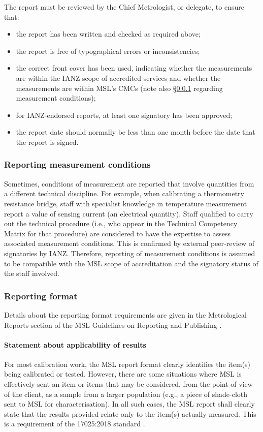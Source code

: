 The report must be reviewed by the Chief Metrologist, or delegate, to ensure that:
\begin{itemize}
\item the report has been written and checked as required above;
\item the report is free of typographical errors or inconsistencies;
\item the correct front cover has been used, indicating whether the measurements are within the IANZ scope of accredited services and whether the measurements are within MSL’s CMCs (note also \S\ref{sss:measurement_conditions} regarding measurement conditions);
\item for IANZ-endorsed reports, at least one signatory has been approved;
\item the report date should normally be less than one month before the date that the report is signed.
\end{itemize} 

\subsubsection{Reporting measurement conditions}
\label{sss:measurement_conditions}
Sometimes, conditions of measurement are reported that involve quantities from a different technical discipline. For example, when calibrating a thermometry resistance bridge, staff with specialist knowledge in temperature measurement report a value of sensing current (an electrical quantity). Staff qualified to carry out the technical procedure (i.e., who appear in the Technical Competency Matrix for that procedure) are considered to have the expertise to assess associated measurement conditions. This is confirmed by external peer-review of signatories by IANZ. Therefore, reporting of measurement conditions is assumed to be compatible with the MSL scope of accreditation and the signatory status of the staff involved.

\subsubsection{Reporting format}
Details about the reporting format requirements are given in the Metrological Reports section of the MSL Guidelines on Reporting and Publishing \cite[\S\ref*{GRP-s:metrological_reports}]{MSL_Reporting_Guidelines}.

\paragraph{Statement about applicability of results}
For most calibration work, the MSL report format clearly identifies the item(s) being calibrated or tested. However, there are some situations where MSL is effectively sent an item or items that may be considered, from the point of view of the client, as a sample from a larger population (e.g., a piece of shade-cloth sent to MSL for characterisation). In all such cases, the MSL report shall clearly state that the results provided relate only to the item(s) actually measured. This is a requirement of the 17025:2018 standard \cite[clause 7.8.2.1~(l)]{ISO_17025}.      

